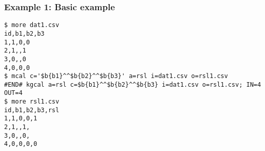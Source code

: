 \subsubsection*{Example 1: Basic example}

\begin{Verbatim}[baselinestretch=0.7,frame=single]
$ more dat1.csv
id,b1,b2,b3
1,1,0,0
2,1,,1
3,0,,0
4,0,0,0
$ mcal c='$b{b1}^^$b{b2}^^$b{b3}' a=rsl i=dat1.csv o=rsl1.csv
#END# kgcal a=rsl c=$b{b1}^^$b{b2}^^$b{b3} i=dat1.csv o=rsl1.csv; IN=4 OUT=4
$ more rsl1.csv
id,b1,b2,b3,rsl
1,1,0,0,1
2,1,,1,
3,0,,0,
4,0,0,0,0
\end{Verbatim}
